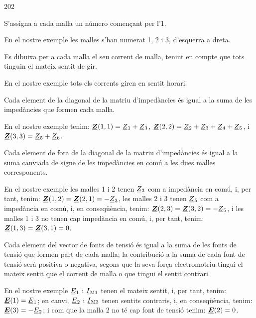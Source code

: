 \begin{dingautolist}{202}
   \item S'assigna a cada malla un número començant per l'1.

          En el nostre exemple les malles s'han numerat 1, 2 i 3, d'esquerra a dreta.
   \item Es dibuixa per a  cada malla el seu corrent de malla, tenint en compte que tots tinguin el mateix sentit de gir.

       En el nostre exemple tots els corrents giren en sentit horari.
   \item Cada element de la diagonal de la matriu d'impedàncies és igual a la suma de les impedàncies que formen cada malla.

       En el nostre exemple tenim: $\mcmplx{Z}(1,1)=\cmplx{Z}_1 + \cmplx{Z}_3$, $\mcmplx{Z}(2,2)=\cmplx{Z}_2 + \cmplx{Z}_3+ \cmplx{Z}_4+ \cmplx{Z}_5$, i $\mcmplx{Z}(3,3)=\cmplx{Z}_5 + \cmplx{Z}_6$.
   \item Cada element de fora de la diagonal de la matriu d'impedàncies és igual a la suma canviada de signe de les impedàncies en comú a les dues malles corresponents.

        En el nostre exemple les malles 1 i 2 tenen $\cmplx{Z}_3$ com a impedància en comú, i, per tant, tenim: $\mcmplx{Z}(1,2)=\mcmplx{Z}(2,1)= -\cmplx{Z}_3$, les malles 2 i 3 tenen $\cmplx{Z}_5$ com a impedància en comú, i, en conseqüència,  tenim: $\mcmplx{Z}(2,3)=\mcmplx{Z}(3,2)= -\cmplx{Z}_5$, i les malles 1 i 3 no tenen cap impedància en comú, i, per tant,  tenim: $\mcmplx{Z}(1,3)=\mcmplx{Z}(3,1)= 0$.
    \item Cada element del vector de fonts de tensió és igual a la suma de les fonts de tensió que formen part de cada malla; la contribució a la suma de cada font de tensió serà positiva o negativa, segons que la seva força electromotriu tingui el mateix sentit que el corrent de malla o que  tingui el sentit contrari.

         En el nostre exemple $\cmplx{E}_1$ i $\cmplx{I}\ped{M1}$ tenen el mateix sentit, i, per tant, tenim:   $\mcmplx{E}(1) = \cmplx{E}_1$; en canvi, $\cmplx{E}_2$ i $\cmplx{I}\ped{M3}$ tenen   sentits contraris, i, en conseqüència,   tenim:   $\mcmplx{E}(3) = -\cmplx{E}_2$; i com que la malla 2 no té cap font de tensió  tenim:   $\mcmplx{E}(2) = 0$.
\end{dingautolist}


